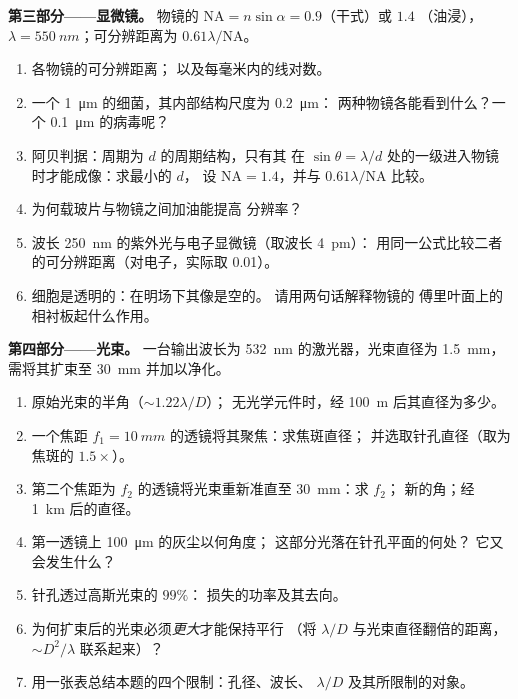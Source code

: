 \begin{problem}
\medskip
\noindent\textbf{第三部分——显微镜。}
物镜的 $\mathrm{NA} = n\sin\alpha = 0.9$（干式）或 $1.4$
（油浸），$\lambda = \qty{550}{nm}$；可分辨距离为 $0.61\lambda/\mathrm{NA}$。
\begin{enumerate}[resume]
  \item 各物镜的可分辨距离；
        以及每毫米内的线对数。
  \item 一个 \qty{1}{\micro m} 的细菌，其内部结构尺度为 \qty{0.2}{\micro m}：
        两种物镜各能看到什么？一个 \qty{0.1}{\micro m} 的病毒呢？
  \item 阿贝判据：周期为 $d$ 的周期结构，只有其
        在 $\sin\theta = \lambda/d$ 处的一级进入物镜时才能成像：求最小的 $d$，
        设 $\mathrm{NA} = 1.4$，并与 $0.61\lambda/\mathrm{NA}$ 比较。
  \item 为何载玻片与物镜之间加油能提高
        分辨率？
  \item 波长 \qty{250}{nm} 的紫外光与电子显微镜（取波长 \qty{4}{pm}）：
        用同一公式比较二者的可分辨距离（对电子，实际取
        \qty{0.01}{}）。
  \item 细胞是透明的：在明场下其像是空的。
        请用两句话解释物镜的
        傅里叶面上的相衬板起什么作用。
\end{enumerate}

\medskip
\noindent\textbf{第四部分——光束。}
一台输出波长为 \qty{532}{nm} 的激光器，光束直径为 \qty{1.5}{mm}，
需将其扩束至 \qty{30}{mm} 并加以净化。
\begin{enumerate}[resume]
  \item 原始光束的半角（$\sim1.22\lambda/D$）；
        无光学元件时，经 \qty{100}{m} 后其直径为多少。
  \item 一个焦距 $f_1 = \qty{10}{mm}$ 的透镜将其聚焦：求焦斑直径；
        并选取针孔直径（取为焦斑的 $1.5\times$）。
  \item 第二个焦距为 $f_2$ 的透镜将光束重新准直至 \qty{30}{mm}：求 $f_2$；
        新的角；经 \qty{1}{km} 后的直径。
  \item 第一透镜上 \qty{100}{\micro m} 的灰尘以何角度；
        这部分光落在针孔平面的何处？
        它又会发生什么？
  \item 针孔透过高斯光束的 $99\%$：
        损失的功率及其去向。
  \item 为何扩束后的光束必须\emph{更大}才能保持平行
        （将 $\lambda/D$ 与光束直径翻倍的距离，
        $\sim D^2/\lambda$ 联系起来）？
  \item 用一张表总结本题的四个限制：孔径、波长、
        $\lambda/D$ 及其所限制的对象。
\end{enumerate}
\end{problem}
